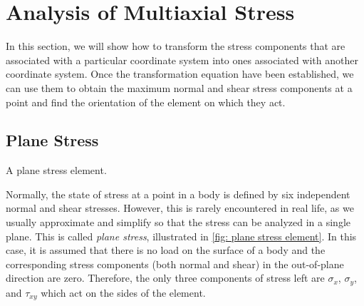 \documentclass[
fontsize=10pt,
a4paper,
twosides=false,
open=any,
svgnames,
]{kaobook} %
\begin{document}
\chapter{Analysis of Multiaxial Stress} \label{chapter: multiaxial stress}

In this section, we will show how to transform the stress components that are associated with a particular coordinate system into ones associated with another coordinate system. Once the transformation equation have been established, we can use them to obtain the maximum normal and shear stress components at a point and find the orientation of the element on which they act.

\section{Plane Stress}

\begin{marginfigure}
  \centering
  \caption{A plane stress element.}
  \label{fig: plane stress element}
\end{marginfigure}

Normally, the state of stress at a point in a body is defined by six independent normal and shear stresses. However, this is rarely encountered in real life, as we usually approximate and simplify so that the stress can be analyzed in a single plane. This is called \emph{plane stress}, illustrated in \cref{fig: plane stress element}. In this case, it is assumed that there is no load on the surface of a body and the corresponding stress components (both normal and shear) in the out-of-plane direction are zero. Therefore, the only three components of stress left are $\sigma_x$, $\sigma_y$, and $\tau_{xy}$ which act on the sides of the element.
\end{document}
